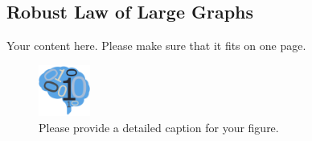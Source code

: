 \documentclass[simplex.tex]{subfiles}
\begin{document}
\subsection{Robust Law of Large Graphs}
Your content here. Please make sure that it fits on one page.

\begin{figure}[!h]
\begin{cframed}
\centering
\includegraphics[width=0.15\textwidth]{neurodata_small.png}
\caption{Please provide a detailed caption for your figure.}
\label{fig:name}
\end{cframed}
\end{figure}
%
%
%
\end{document}
